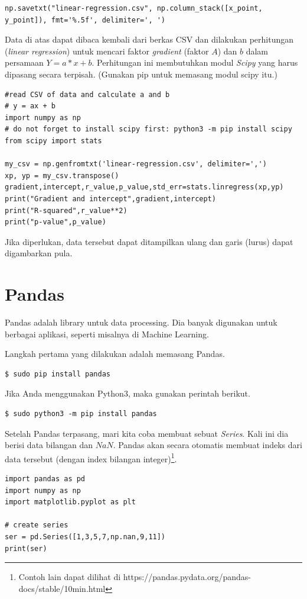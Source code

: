 \begin{verbatim}
np.savetxt("linear-regression.csv", np.column_stack([x_point, y_point]), fmt='%.5f', delimiter=', ')
\end{verbatim}

Data di atas dapat dibaca kembali dari berkas CSV dan dilakukan
perhitungan ({\em linear regression}) untuk mencari faktor {\em gradient}
(faktor $A$) dan $b$ dalam persamaan $Y = a*x + b$.
Perhitungan ini membutuhkan modul {\em Scipy} yang harus dipasang
secara terpisah. (Gunakan pip untuk memasang modul scipy itu.)

\begin{verbatim}
#read CSV of data and calculate a and b
# y = ax + b
import numpy as np
# do not forget to install scipy first: python3 -m pip install scipy
from scipy import stats

my_csv = np.genfromtxt('linear-regression.csv', delimiter=',')
xp, yp = my_csv.transpose()
gradient,intercept,r_value,p_value,std_err=stats.linregress(xp,yp)
print("Gradient and intercept",gradient,intercept)
print("R-squared",r_value**2)
print("p-value",p_value)
\end{verbatim}

Jika diperlukan, data tersebut dapat ditampilkan ulang dan garis (lurus)
dapat digambarkan pula.

\section{Pandas}
Pandas adalah library untuk data processing. Dia banyak digunakan untuk
berbagai aplikasi, seperti misalnya di Machine Learning.

Langkah pertama yang dilakukan adalah memasang Pandas.

\begin{verbatim}
$ sudo pip install pandas
\end{verbatim}

Jika Anda menggunakan Python3, maka gunakan perintah berikut.
\begin{verbatim}
$ sudo python3 -m pip install pandas
\end{verbatim}

Setelah Pandas terpasang, mari kita coba membuat sebuat {\em Series}.
Kali ini dia berisi data bilangan dan $NaN$.
Pandas akan secara otomatis membuat indeks dari data tersebut (dengan
index bilangan integer)\footnote{Contoh lain dapat dilihat di
https://pandas.pydata.org/pandas-docs/stable/10min.html}.

\begin{verbatim}
import pandas as pd
import numpy as np
import matplotlib.pyplot as plt

# create series
ser = pd.Series([1,3,5,7,np.nan,9,11])
print(ser)
\end{verbatim}

